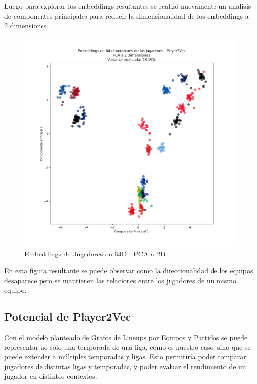 \documentclass[
  a4paper,
]{article}
\begin{document}
Luego para explorar los embeddings resultantes se realizó nuevamente un
analisis de componentes principales para reducir la dimensionalidad de
los embeddings a 2 dimensiones.

\begin{figure}
  \includegraphics{recursos_pdf/graficos/players_64_2d.png}
    \caption{Embeddings de Jugadores en 64D - PCA a 2D}
\end{figure}

En esta figura resultante se puede observar como la direccionalidad de
los equipos desaparece pero se mantienen las relaciones entre los
jugadores de un mismo equipo.

\hypertarget{potencial-de-player2vec}{%
\subsection{Potencial de Player2Vec}\label{potencial-de-player2vec}}

Con el modelo planteado de Grafos de Lineups por Equipos y Partidos se
puede representar no solo una temporada de una liga, como es nuestro
caso, sino que se puede extender a múltiples temporadas y ligas. Esto
permitiría poder comparar jugadores de distintas ligas y temporadas, y
poder evaluar el rendimiento de un jugador en distintos contextos.
\end{document}
